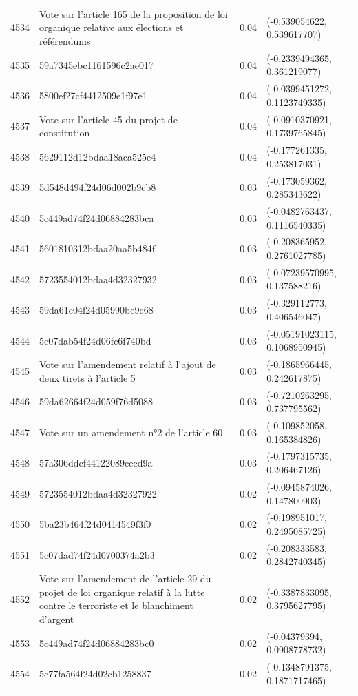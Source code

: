 \begin{table}[ht]
\begin{tabular}{rlrl}
  4534 & Vote sur l'article 165 de la proposition de loi organique relative aux élections et référendums & 0.04 & (-0.539054622, 0.539617707) \\ 
  4535 & 59a7345ebc1161596c2ae017 & 0.04 & (-0.2339494365, 0.361219077) \\ 
  4536 & 5800ef27cf4412509e1f97e1 & 0.04 & (-0.0399451272, 0.1123749335) \\ 
  4537 & Vote sur l'article 45 du projet de constitution & 0.04 & (-0.0910370921, 0.1739765845) \\ 
  4538 & 5629112d12bdaa18aca525e4 & 0.04 & (-0.177261335, 0.253817031) \\ 
  4539 & 5d548d494f24d06d002b9cb8 & 0.03 & (-0.173059362, 0.285343622) \\ 
  4540 & 5c449ad74f24d06884283bca & 0.03 & (-0.0482763437, 0.1116540335) \\ 
  4541 & 5601810312bdaa20aa5b484f & 0.03 & (-0.208365952, 0.2761027785) \\ 
  4542 & 5723554012bdaa4d32327932 & 0.03 & (-0.07239570995, 0.137588216) \\ 
  4543 & 59da61e04f24d05990be9c68 & 0.03 & (-0.329112773, 0.406546047) \\ 
  4544 & 5c07dab54f24d06fc6f740bd & 0.03 & (-0.05191023115, 0.1068950945) \\ 
  4545 & Vote sur l'amendement relatif à l'ajout de deux tirets à l'article 5 & 0.03 & (-0.1865966445, 0.242617875) \\ 
  4546 & 59da62664f24d059f76d5088 & 0.03 & (-0.7210263295, 0.737795562) \\ 
  4547 & Vote sur un amendement n°2 de l'article 60 & 0.03 & (-0.109852058, 0.165384826) \\ 
  4548 & 57a306ddcf44122089ceed9a & 0.03 & (-0.1797315735, 0.206467126) \\ 
  4549 & 5723554012bdaa4d32327922 & 0.02 & (-0.0945874026, 0.147800903) \\ 
  4550 & 5ba23b464f24d0414549f3f0 & 0.02 & (-0.198951017, 0.2495085725) \\ 
  4551 & 5c07dad74f24d0700374a2b3 & 0.02 & (-0.208333583, 0.2842740345) \\ 
  4552 & Vote sur l'amendement de l'article 29 du projet de loi organique relatif à la lutte contre le terroriste et le blanchiment d'argent & 0.02 & (-0.3387833095, 0.3795627795) \\ 
  4553 & 5c449ad74f24d06884283bc0 & 0.02 & (-0.04379394, 0.0908778732) \\ 
  4554 & 5c77fa564f24d02cb1258837 & 0.02 & (-0.1348791375, 0.1871717465) \\ 

\end{tabular}
\end{table}
